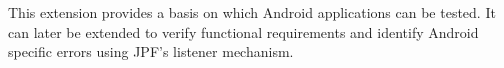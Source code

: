 \documentclass{acm_proc_article-sp}
\begin{document}
This extension provides a basis on which Android applications can be tested. It can later be extended to verify functional requirements and identify Android specific errors using JPF's listener mechanism.


\scriptsize
\end{document}
